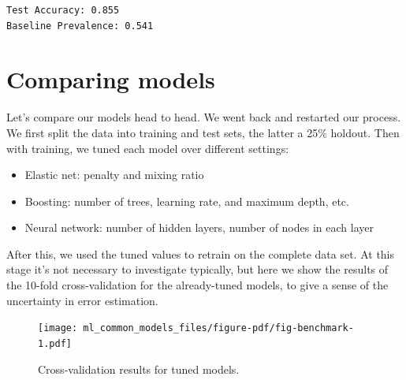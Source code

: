 \documentclass[
  letterpaper,
]{krantz}
\newenvironment{Shaded}{}{}
\newcommand{\CommentTok}[1]{\textcolor[rgb]{0.38,0.63,0.69}{\textit{#1}}}
\newcommand{\FunctionTok}[1]{\textcolor[rgb]{0.02,0.16,0.49}{#1}}
\newcommand{\NormalTok}[1]{#1}
\newcommand{\OtherTok}[1]{\textcolor[rgb]{0.00,0.44,0.13}{#1}}
\newcommand{\SpecialCharTok}[1]{\textcolor[rgb]{0.25,0.44,0.63}{#1}}
\newcommand{\StringTok}[1]{\textcolor[rgb]{0.25,0.44,0.63}{#1}}
\providecommand{\tightlist}{%
  \setlength{\itemsep}{0pt}\setlength{\parskip}{0pt}}\usepackage{longtable,booktabs,array}
\begin{document}
\begin{Shaded}
\end{Shaded}

\begin{verbatim}
Test Accuracy: 0.855
Baseline Prevalence: 0.541
\end{verbatim}

\section{Comparing models}\label{comparing-models}

Let's compare our models head to head. We went back and restarted our
process. We first split the data into training and test sets, the latter
a 25\% holdout. Then with training, we tuned each model over different
settings:

\begin{itemize}
\tightlist
\item
  Elastic net: penalty and mixing ratio
\item
  Boosting: number of trees, learning rate, and maximum depth, etc.
\item
  Neural network: number of hidden layers, number of nodes in each layer
\end{itemize}

After this, we used the tuned values to retrain on the complete data
set. At this stage it's not necessary to investigate typically, but here
we show the results of the 10-fold cross-validation for the
already-tuned models, to give a sense of the uncertainty in error
estimation.

\begin{figure}

{\centering \texttt{[image: ml\_common\_models\_files/figure-pdf/fig-benchmark-1.pdf]}

}

\caption{\label{fig-benchmark}Cross-validation results for tuned
models.}

\end{figure}
\end{document}
